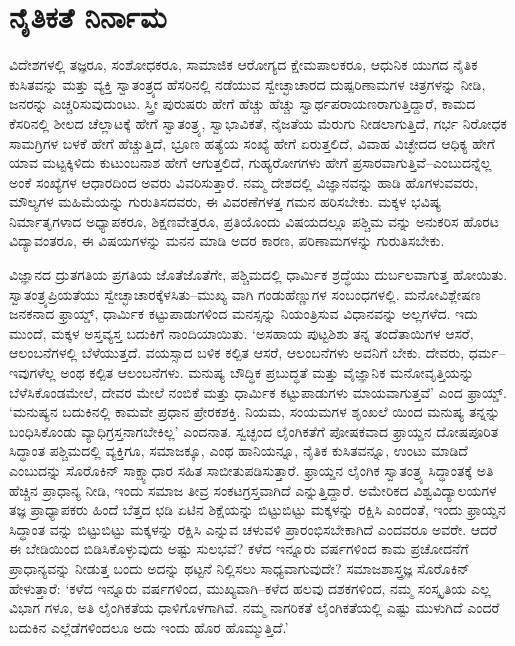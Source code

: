 \section{ನೈತಿಕತೆ ನಿರ್ನಾಮ}

ವಿದೇಶಗಳಲ್ಲಿ ತಜ್ಞರೂ, ಸಂಶೋಧಕರೂ, ಸಾಮಾಜಿಕ ಆರೋಗ್ಯದ ಕ್ಷೇಮಪಾಲಕರೂ, ಆಧುನಿಕ ಯುಗದ ನೈತಿಕ ಕುಸಿತವನ್ನು ಮತ್ತು ವ್ಯಕ್ತಿ ಸ್ವಾತಂತ್ರ್ಯದ ಹೆಸರಿನಲ್ಲಿ ನಡೆಯುವ ಸ್ವೇಚ್ಛಾಚಾರದ ದುಷ್ಪರಿಣಾಮಗಳ ಚಿತ್ರಗಳನ್ನು ನೀಡಿ, ಜನರನ್ನು ಎಚ್ಚರಿಸುವುದುಂಟು. ಸ್ತ್ರೀ ಪುರುಷರು ಹೇಗೆ ಹೆಚ್ಚು ಹೆಚ್ಚು ಸ್ವಾರ್ಥಪರಾಯಣರಾಗುತ್ತಿದ್ದಾರೆ, ಕಾಮದ ಕೆಸರಿನಲ್ಲಿ ಶೀಲದ ಚೆಲ್ಲಾಟಕ್ಕೆ ಹೇಗೆ ಸ್ವಾತಂತ್ರ್ಯ, ಸ್ವಾಭಾವಿಕತೆ, ನೈಜತೆಯ ಮೆರುಗು ನೀಡಲಾಗುತ್ತಿದೆ, ಗರ್ಭ ನಿರೋಧಕ ಸಾಮಗ್ರಿಗಳ ಬಳಕೆ ಹೇಗೆ ಹೆಚ್ಚುತ್ತಿದೆ, ಭ್ರೂಣ ಹತ್ಯೆಯ ಸಂಖ್ಯೆ ಹೇಗೆ ಏರುತ್ತಲಿದೆ, ವಿವಾಹ ವಿಚ್ಛೇದದ ಆಧಿಕ್ಯ ಹೇಗೆ ಯಾವ ಮಟ್ಟಕ್ಕಿಳಿದು ಕುಟುಂಬನಾಶ ಹೇಗೆ ಆಗುತ್ತಲಿದೆ, ಗುಹ್ಯರೋಗಗಳು ಹೇಗೆ ಪ್ರಸಾರವಾಗುತ್ತಿವೆ–ಎಂಬುದನ್ನೆಲ್ಲ ಅಂಕೆ ಸಂಖ್ಯೆಗಳ ಆಧಾರದಿಂದ ಅವರು ವಿವರಿಸುತ್ತಾರೆ. ನಮ್ಮ ದೇಶದಲ್ಲಿ ವಿಜ್ಞಾನವನ್ನು ಹಾಡಿ ಹೊಗಳುವವರು, ಮೌಲ್ಯಗಳ ಮಹಿಮೆಯನ್ನು ಗುರುತಿಸದವರು, ಈ ವಿವರಣೆಗಳತ್ತ ಗಮನ ಹರಿಸಬೇಕು. ಮಕ್ಕಳ ಭವಿಷ್ಯ ನಿರ್ಮಾತೃಗಳಾದ ಅಧ್ಯಾಪಕರೂ, ಶಿಕ್ಷಣವೇತ್ತರೂ, ಪ್ರತಿಯೊಂದು ವಿಷಯದಲ್ಲೂ ಪಶ್ಚಿಮ ವನ್ನು ಅನುಕರಿಸ ಹೊರಟ ವಿದ್ಯಾವಂತರೂ, ಈ ವಿಷಯಗಳನ್ನು ಮನನ ಮಾಡಿ ಅದರ ಕಾರಣ, ಪರಿಣಾಮಗಳನ್ನು ಗುರುತಿಸಬೇಕು.

ವಿಜ್ಞಾನದ ದ್ರುತಗತಿಯ ಪ್ರಗತಿಯ ಜೊತೆಜೊತೆಗೇ, ಪಶ್ಚಿಮದಲ್ಲಿ ಧಾರ್ಮಿಕ ಶ್ರದ್ಧೆಯು ದುರ್ಬಲವಾಗುತ್ತ ಹೋಯಿತು. ಸ್ವಾತಂತ್ರ್ಯಪ್ರಿಯತೆಯು ಸ್ವೇಚ್ಛಾಚಾರಕ್ಕೆಳಸಿತು–ಮುಖ್ಯ ವಾಗಿ ಗಂಡುಹೆಣ್ಣುಗಳ ಸಂಬಂಧಗಳಲ್ಲಿ. ಮನೋವಿಶ್ಲೇಷಣ ಜನಕನಾದ ಫ್ರಾಯ್ಡ್, ಧಾರ್ಮಿಕ ಕಟ್ಟುಪಾಡುಗಳಿಂದ ಮನಸ್ಸನ್ನು ನಿಯಂತ್ರಿಸುವ ವಿಧಾನವನ್ನು ಅಲ್ಲಗಳೆದ. ಇದು ಮುಂದೆ, ಮಕ್ಕಳ ಅಸ್ತವ್ಯಸ್ತ ಬದುಕಿಗೆ ನಾಂದಿಯಾಯಿತು. ‘ಅಸಹಾಯ ಪುಟ್ಟಶಿಶು ತನ್ನ ತಂದೆತಾಯಿಗಳ ಆಸರೆ, ಆಲಂಬನೆಗಳಲ್ಲಿ ಬೆಳೆಯುತ್ತದೆ. ವಯಸ್ಸಾದ ಬಳಿಕ ಕಲ್ಪಿತ ಆಸರೆ, ಆಲಂಬನೆಗಳು ಅವನಿಗೆ ಬೇಕು. ದೇವರು, ಧರ್ಮ–ಇವುಗಳೆಲ್ಲ ಅಂಥ ಕಲ್ಪಿತ ಆಲಂಬನೆಗಳು. ಮನುಷ್ಯ ಬೌದ್ಧಿಕ ಪ್ರಬುದ್ಧತೆ ಮತ್ತು ವೈಜ್ಞಾನಿಕ ಮನೋವೃತ್ತಿಯನ್ನು ಬೆಳೆಸಿಕೊಂಡಮೇಲೆ, ದೇವರ ಮೇಲೆ ನಂಬಿಕೆ ಮತ್ತು ಧಾರ್ಮಿಕ ಕಟ್ಟುಪಾಡುಗಳು ಮಾಯವಾಗುತ್ತವೆ’ ಎಂದ ಫ್ರಾಯ್ಡ್. ‘ಮನುಷ್ಯನ ಬದುಕಿನಲ್ಲಿ ಕಾಮವೇ ಪ್ರಧಾನ ಪ್ರೇರಕಶಕ್ತಿ. ನಿಯಮ, ಸಂಯಮಗಳ ಶೃಂಖಲೆ ಯಿಂದ ಮನುಷ್ಯ ತನ್ನನ್ನು ಬಂಧಿಸಿಕೊಂಡು ವ್ಯಾಧಿಗ್ರಸ್ತನಾಗಬೇಕಿಲ್ಲ’ ಎಂದನಾತ. ಸ್ವಚ್ಛಂದ ಲೈಂಗಿಕತೆಗೆ ಪೋಷಕವಾದ ಫ್ರಾಯ್ಡನ ದೋಷಪೂರಿತ ಸಿದ್ಧಾಂತ ಪಶ್ಚಿಮದಲ್ಲಿ ವ್ಯಕ್ತಿಗೂ, ಸಮಾಜಕ್ಕೂ, ಎಂಥ ಹಾನಿಯನ್ನೂ, ನೈತಿಕ ಕುಸಿತವನ್ನೂ, ಉಂಟು ಮಾಡಿದೆ ಎಂಬುದನ್ನು ಸೊರೊಕಿನ್ ಸಾಕ್ಷ್ಯಾಧಾರ ಸಹಿತ ಸಾಬೀತುಪಡಿಸುತ್ತಾರೆ. ಫ್ರಾಯ್ಡನ ಲೈಂಗಿಕ ಸ್ವಾತಂತ್ರ್ಯ ಸಿದ್ಧಾಂತಕ್ಕೆ ಅತಿ ಹೆಚ್ಚಿನ ಪ್ರಾಧಾನ್ಯ ನೀಡಿ, ಇಂದು ಸಮಾಜ ತೀವ್ರ ಸಂಕಟಗ್ರಸ್ತವಾಗಿದೆ ಎನ್ನುತ್ತಿದ್ದಾರೆ. ಅಮೇರಿಕದ ವಿಶ್ವವಿದ್ಯಾಲಯಗಳ ತಜ್ಞ ಪ್ರಾಧ್ಯಾಪಕರು ಹಿಂದೆ ಬೆತ್ತದ ಛಡಿ ಏಟಿನ ಶಿಕ್ಷೆಯನ್ನು ಬಿಟ್ಟುಬಿಟ್ಟು ಮಕ್ಕಳನ್ನು ರಕ್ಷಿಸಿ ಎಂದಂತೆ, ಇಂದು ಫ್ರಾಯ್ಡನ ಸಿದ್ಧಾಂತ ವನ್ನು ಬಿಟ್ಟುಬಿಟ್ಟು ಮಕ್ಕಳನ್ನು ರಕ್ಷಿಸಿ ಎನ್ನುವ ಚಳುವಳಿ ಪ್ರಾರಂಭಿಸಬೇಕಾಗಿದೆ ಎಂದವರೂ ಅವರೇ. ಆದರೆ ಈ ಬೇಡಿಯಿಂದ ಬಿಡಿಸಿಕೊಳ್ಳುವುದು ಅಷ್ಟು ಸುಲಭವೆ? ಕಳೆದ ಇನ್ನೂರು ವರ್ಷಗಳಿಂದ ಕಾಮ ಪ್ರಚೋದನೆಗೆ ಪ್ರಾಧಾನ್ಯವನ್ನು ನೀಡುತ್ತ ಬಂದು ಅದನ್ನು ಥಟ್ಟನೆ ನಿಲ್ಲಿಸಲು ಸಾಧ್ಯವಾಗುವುದೇ? ಸಮಾಜಶಾಸ್ತ್ರಜ್ಞ ಸೊರೊಕಿನ್ ಹೇಳುತ್ತಾರೆ: ‘ಕಳೆದ ಇನ್ನೂರು ವರ್ಷಗಳಿಂದ, ಮುಖ್ಯವಾಗಿ–ಕಳೆದ ಹಲವು ದಶಕಗಳಿಂದ, ನಮ್ಮ ಸಂಸ್ಕೃತಿಯ ಎಲ್ಲ ವಿಭಾಗ ಗಳೂ, ಅತಿ ಲೈಂಗಿಕತೆಯ ಧಾಳಿಗೊಳಗಾಗಿವೆ. ನಮ್ಮ ನಾಗರಿಕತೆ ಲೈಂಗಿಕತೆಯಲ್ಲಿ ಎಷ್ಟು ಮುಳುಗಿದೆ ಎಂದರೆ ಬದುಕಿನ ಎಲ್ಲೆಡೆಗಳಿಂದಲೂ ಅದು ಇಂದು ಹೊರ ಹೊಮ್ಮುತ್ತಿದೆ.’

